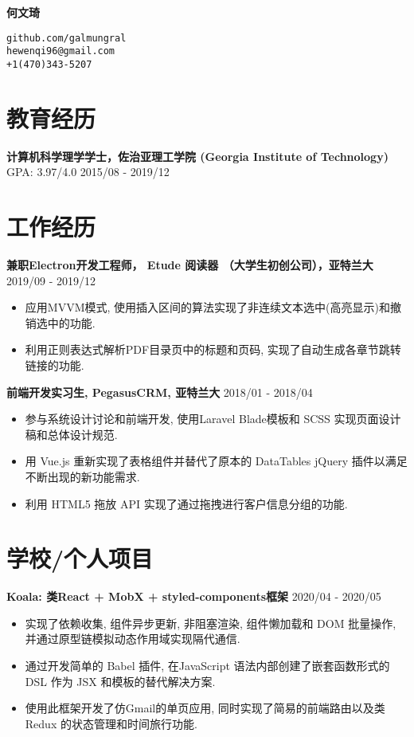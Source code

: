 \documentclass[10.5pt]{article}
\begin{document}
\parbox{0.25\textwidth}{\hfill}
\parbox{0.5\textwidth}{\centering\huge\bfseries 何文琦}
\parbox{0.25\textwidth}{\texttt{github.com/galmungral\\hewenqi96@gmail.com\\+1(470)343-5207}}

\section*{教育经历}
\textbf{计算机科学理学学士，佐治亚理工学院 (Georgia Institute of Technology)} GPA: 3.97/4.0 \hfill 2015/08 - 2019/12

\section*{工作经历}
\textbf{兼职Electron开发工程师， Etude 阅读器 （大学生初创公司），亚特兰大} \hfill 2019/09 - 2019/12
\begin{itemize}
\item 应用MVVM模式, 使用插入区间的算法实现了非连续文本选中(高亮显示)和撤销选中的功能.
\item 利用正则表达式解析PDF目录页中的标题和页码, 实现了自动生成各章节跳转链接的功能.
\end{itemize}

\textbf{前端开发实习生, PegasusCRM, 亚特兰大} \hfill 2018/01 - 2018/04
\begin{itemize}
\item  参与系统设计讨论和前端开发, 使用Laravel Blade模板和 SCSS 实现页面设计稿和总体设计规范.
\item 用 Vue.js 重新实现了表格组件并替代了原本的 DataTables jQuery 插件以满足不断出现的新功能需求.
\item 利用 HTML5 拖放 API 实现了通过拖拽进行客户信息分组的功能.
\end{itemize}


\section*{学校/个人项目}
\textbf{Koala: 类React + MobX + styled-components框架} \hfill 2020/04 - 2020/05
\begin{itemize}
\item 实现了依赖收集, 组件异步更新, 非阻塞渲染, 组件懒加载和 DOM 批量操作, 并通过原型链模拟动态作用域实现隔代通信.
\item 通过开发简单的 Babel 插件, 在JavaScript 语法内部创建了嵌套函数形式的 DSL 作为 JSX 和模板的替代解决方案.
\item 使用此框架开发了仿Gmail的单页应用, 同时实现了简易的前端路由以及类 Redux 的状态管理和时间旅行功能.
\end{itemize}
\end{document}
